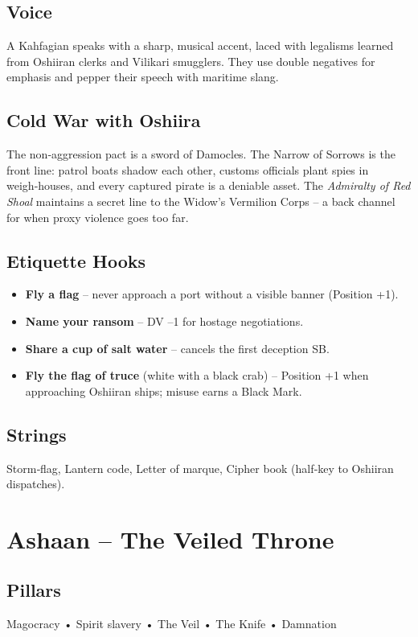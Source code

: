 \documentclass[11pt]{book}
\begin{document}
\subsection*{Voice}
A Kahfagian speaks with a sharp, musical accent, laced with legalisms learned from Oshiiran clerks and Vilikari smugglers. They use double negatives for emphasis and pepper their speech with maritime slang.

\subsection*{Cold War with Oshiira}
The non‑aggression pact is a sword of Damocles. The Narrow of Sorrows is the front line: patrol boats shadow each other, customs officials plant spies in weigh‑houses, and every captured pirate is a deniable asset. The \textit{Admiralty of Red Shoal} maintains a secret line to the Widow's Vermilion Corps -- a back channel for when proxy violence goes too far.

\subsection*{Etiquette Hooks}
\begin{itemize}
\item \textbf{Fly a flag} -- never approach a port without a visible banner (Position +1).
\item \textbf{Name your ransom} -- DV --1 for hostage negotiations.
\item \textbf{Share a cup of salt water} -- cancels the first deception SB.
\item \textbf{Fly the flag of truce} (white with a black crab) -- Position +1 when approaching Oshiiran ships; misuse earns a Black Mark.
\end{itemize}

\subsection*{Strings}
Storm‑flag, Lantern code, Letter of marque, Cipher book (half‑key to Oshiiran dispatches).

\section{Ashaan -- The Veiled Throne}

\subsection*{Pillars}
Magocracy • Spirit slavery • The Veil • The Knife • Damnation
\end{document}
